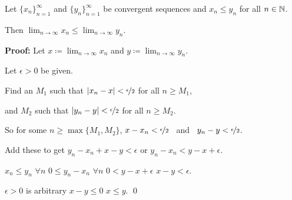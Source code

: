 \documentclass[10pt,aspectratio=169]{beamer}
\begin{document}
\begin{frame}

\begin{lemma}
Let $\{ x_n \}_{n=1}^\infty$ and $\{ y_n \}_{n=1}^\infty$ be
convergent sequences and
\quad $x_n \leq y_n$
\quad
for all $n \in {\mathbb{N}}$.

\pause
Then \quad 
$\displaystyle \lim_{n\to\infty} x_n \leq \lim_{n\to\infty} y_n$.
\end{lemma}

\pause
\textbf{Proof:}
Let $\displaystyle x \coloneqq \lim_{n\to\infty} x_n$
and $\displaystyle y \coloneqq \lim_{n\to\infty} y_n$. 

\medskip
\pause

Let 
$\epsilon > 0$ be given.

\medskip
\pause

Find an $M_1$ such that $\left\lvert {x_n-x} \right\rvert < \nicefrac{\epsilon}{2}$ for all $n \geq M_1$,

\pause
and $M_2$ such that $\left\lvert {y_n-y} \right\rvert < \nicefrac{\epsilon}{2}$
for all $n \geq M_2$.

\pause
\medskip

So for some $n \geq \max\{ M_1, M_2 \}$, \quad
$x-x_n < \nicefrac{\epsilon}{2}$ ~and~
$y_n-y < \nicefrac{\epsilon}{2}$.

\pause
\medskip

Add these to get
\quad $y_n-x_n+x-y < \epsilon$
\pause
\quad or \quad $y_n-x_n < y-x+ \epsilon$.

\pause
\medskip

$x_n \leq y_n$ $\forall n$
\pause
\wthus $0 \leq y_n-x_n$ $\forall n$
\pause
\wthus $0 < y-x+ \epsilon$
\pause
\wthus $x-y < \epsilon$.

\pause
\medskip

$\epsilon > 0$ is arbitrary
\pause
\wthus $x-y \leq 0$
\pause
\wthus $x \leq y$.
\qed

\end{frame}
\end{document}
